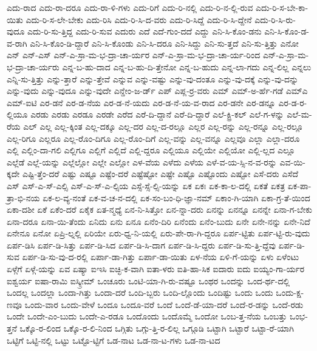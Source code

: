 {ಎದು-ರಾದ
ಎದು-ರಾ-ದರೂ
ಎದು-ರಾ-ಳಿ-ಗಳು
ಎದು-ರಿಗೆ
ಎದು-ರಿ-ನಲ್ಲಿ
ಎದು-ರಿ-ನ-ಲ್ಲಿ-ರುವ
ಎದು-ರಿ-ಸ-ಬೇ-ಕಾ-ಯಿತು
ಎದು-ರಿ-ಸ-ಲೇ-ಬೇಕು
ಎದು-ರಿಸಿ
ಎದು-ರಿ-ಸಿ-ದ-ವರು
ಎದು-ರಿ-ಸಿದ್ದೆ
ಎದು-ರಿ-ಸಿ-ದ್ದೇನೆ
ಎದು-ರಿ-ಸಿ-ರು-ವುದೂ
ಎದು-ರಿ-ಸು-ತ್ತಿದ್ದ
ಎದು-ರಿ-ಸುವ
ಎದುರು
ಎದೆ
ಎದೆ-ಗುಂ-ದದೆ
ಎದ್ದು
ಎನಿ-ಸಿ-ಕೊಂ-ಡನು
ಎನಿ-ಸಿ-ಕೊಂ-ಡ-ವ-ರಾಗಿ
ಎನಿ-ಸಿ-ಕೊಂ-ಡಿ-ದ್ದಾರೆ
ಎನಿ-ಸಿ-ಕೊಂಡು
ಎನಿ-ಸಿ-ದರೂ
ಎನಿ-ಸಿದ್ದು
ಎನಿ-ಸು-ತ್ತದೆ
ಎನಿ-ಸು-ತ್ತಿತ್ತು
ಎನೋ
ಎನ್
ಎನ್-ಎಸ್
ಎನ್-ಎ-ಸ್ರಾ-ಮ-ಭ-ದ್ರಾ-ಚಾ-ರ್ಯರ
ಎನ್-ಎ-ಸ್ರಾ-ಮ-ಭ-ದ್ರಾ-ಚಾ-ರ್ಯ-ರಿಂದ
ಎನ್-ಎ-ಸ್ರಾ-ಮ-ಭ-ದ್ರಾ-ಚಾ-ರ್ಯರು
ಎನ್ನ-ಬ-ಹು-ದಾದ
ಎನ್ನ-ಬ-ಹು-ದಿ-ತ್ತೇನೋ
ಎನ್ನ-ಬ-ಹುದು
ಎನ್ನ-ಲಾ-ಗದು
ಎನ್ನ-ಲಿಲ್ಲ
ಎನ್ನಲು
ಎನ್ನಿ-ಸು-ತ್ತಿತ್ತು
ಎನ್ನು-ತ್ತಾರೆ
ಎನ್ನು-ತ್ತೇವೆ
ಎನ್ನುವ
ಎನ್ನು-ವಷ್ಟು
ಎನ್ನು-ವು-ದಂತೂ
ಎನ್ನು-ವು-ದಕ್ಕೆ
ಎನ್ನು-ವು-ದನ್ನು
ಎನ್ನು-ವುದು
ಎನ್ನು-ವುದೂ
ಎನ್ನು-ವುದೇ
ಎನ್ಡೇಂ-ಜ-ರ್ಡ್
ಎಪ್
ಎಪ್ಲ-ರ್ರ-ವರು
ಎಮ್
ಎಮ್-ಅ-ರ್ಹೆ-ಗಡೆ
ಎಮ್ಎ
ಎಮ್-ಐಟಿ
ಎರ-ಡನೆ
ಎರ-ಡ-ನೆಯ
ಎರ-ಡ-ನೆ-ಯದು
ಎರ-ಡ-ನೆ-ಯ-ವ-ರಾದ
ಎರ-ಡನೇ
ಎರ-ಡನ್ನೂ
ಎರ-ಡ-ರ-ಲ್ಲಿಯೂ
ಎರಡು
ಎರಡು
ಎರಡೂ
ಎರಡೇ
ಎರೆದ
ಎರೆ-ದಿ-ದ್ದಾನೆ
ಎರೆ-ದಿ-ದ್ದಾರೆ
ಎಲೆ-ಕ್ಟ್ರಿ-ಕಲ್
ಎಲೆ-ಗ-ಳನ್ನು
ಎಲೆ-ಮ-ರೆಯ
ಎಲ್
ಎಲ್ಲ
ಎಲ್ಲ-ಕ್ಕಿಂತ
ಎಲ್ಲ-ದಕ್ಕೂ
ಎಲ್ಲ-ದರ
ಎಲ್ಲ-ದ-ರಲ್ಲೂ
ಎಲ್ಲರ
ಎಲ್ಲ-ರನ್ನು
ಎಲ್ಲ-ರನ್ನೂ
ಎಲ್ಲ-ರಲ್ಲೂ
ಎಲ್ಲ-ರಿಗೂ
ಎಲ್ಲರೂ
ಎಲ್ಲ-ರೊಂ-ದಿಗೂ
ಎಲ್ಲ-ರೊಂ-ದಿಗೆ
ಎಲ್ಲ-ವನ್ನು
ಎಲ್ಲ-ವನ್ನೂ
ಎಲ್ಲವೂ
ಎಲ್ಲಾ
ಎಲ್ಲಾ-ದರೂ
ಎಲ್ಲಿ
ಎಲ್ಲಿಂ-ದಾ-ಗಲಿ
ಎಲ್ಲಿಗೂ
ಎಲ್ಲಿಗೆ
ಎಲ್ಲಿದೆ
ಎಲ್ಲಿ-ದ್ದರೂ
ಎಲ್ಲಿಯೂ
ಎಲ್ಲಿಯೇ
ಎಲ್ಲಿಯೋ
ಎಲ್ಲಿ-ಲ್ಲದ
ಎಲ್ಲೂ
ಎಲ್ಲೆಡೆ
ಎಲ್ಲೆ-ಯನ್ನು
ಎಲ್ಲೆಲ್ಲೋ
ಎಲ್ಲೇ
ಎಲ್ಲೋ
ಎಳ-ವೆಯ
ಎಳೆದು
ಎಳೆಯ
ಎಳೆ-ವ-ಯ-ಸ್ಸಿ-ನ-ವ-ರನ್ನು
ಎವ-ಯಿ-ಕ್ಕದೇ
ಎಷ್ಟಿ-ತ್ತೆಂ-ದರೆ
ಎಷ್ಟು
ಎಷ್ಟೂ
ಎಷ್ಟೆಂ-ದರೆ
ಎಷ್ಟೆಷ್ಟೋ
ಎಷ್ಟೇ
ಎಷ್ಟೊ
ಎಷ್ಟೊಂದು
ಎಷ್ಟೋ
ಎಸೆ-ದರು
ಎಸೆದೆ
ಎಸ್
ಎಸ್-ಎ-ಸ್-ಎಲ್ಸಿ
ಎಸ್-ಎ-ಸ್-ಎ-ಲ್ಸಿಯ
ಎಸ್ಸೆ-ಸ್ಸೆ-ಲ್ಸಿ-ಯನ್ನು
ಏಕ
ಏಕಃ
ಏಕ-ಕಾ-ಲ-ದಲ್ಲಿ
ಏಕತೆ
ಏಕತ್ರ
ಏಕ-ಪಾ-ತ್ರಾ-ಭಿ-ನಯ
ಏಕ-ಲ-ವ್ಯ-ನಂತೆ
ಏಕ-ವ-ಚ-ನ-ದಲ್ಲಿ
ಏಕ-ಸಂ-ಬಂ-ಧಿ-ಜ್ಞಾ-ನಮ್
ಏಕಾಂ-ಗಿ-ಯಾಗಿ
ಏಕಾ-ಗ್ರ-ತೆ-ಯಿಂದ
ಏಕಾ-ದಶೀ
ಏಕೆ
ಏಕೆಂ-ದರೆ
ಏಕೈಕ
ಏತ-ನ್ಮಧ್ಯೆ
ಏನ-ನಿ-ಸಿತ್ತೋ
ಏನ-ನ್ನಾ-ದರು
ಏನನ್ನು
ಏನನ್ನೂ
ಏನನ್ನೇ
ಏನಾ-ಗ-ಬೇಕು
ಏನಾ-ದರೂ
ಏನಾ-ಯಿ-ತೆಂದು
ಏನಿದು
ಏನು
ಏನೂ
ಏನೆಂ-ದಿರಿ
ಏನೆಂದು
ಏನೆಂ-ಬುದು
ಏನೇ
ಏನೇ-ನನ್ನು
ಏನೇ-ನಿದೆ
ಏನೇನೂ
ಏನೋ
ಏಪ್ರಿ-ಲ್ನಲ್ಲಿ
ಏರಿಯೇ
ಏರು-ಧ್ವ-ನಿ-ಯಲ್ಲಿ
ಏರು-ಪೇ-ರಾ-ಗಿ-ದ್ದರೂ
ಏರ್ಪ-ಟ್ಟಿತು
ಏರ್ಪ-ಟ್ಟಿ-ರು-ವುದು
ಏರ್ಪ-ಡಿಸಿ
ಏರ್ಪ-ಡಿ-ಸಿತ್ತು
ಏರ್ಪ-ಡಿ-ಸಿದ
ಏರ್ಪ-ಡಿ-ಸಿ-ದಾಗ
ಏರ್ಪ-ಡಿ-ಸಿ-ದ್ದರು
ಏರ್ಪ-ಡಿ-ಸು-ತ್ತಿ-ದ್ದೆವು
ಏರ್ಪ-ಡಿ-ಸುವ
ಏರ್ಪ-ಡಿ-ಸು-ವು-ದ-ರಲ್ಲಿ
ಏರ್ಪಾ-ಡಾ-ಗಿತ್ತು
ಏರ್ಪಾ-ಡಾ-ಯಿತು
ಏಳ-ನೆಯ
ಏಳಿ-ಗೆ-ಯನ್ನು
ಏಳು
ಏಳೆಂಟು
ಏಳ್ಗೆಗೆ
ಏಳ್ಗೆ-ಯನ್ನು
ಏವ
ಏಷ್ಯಾ
ಐಇಸಿ
ಐಚ್ಛಿ-ಕ-ವಾಗಿ
ಐತಾ-ಳರು
ಐತಿ-ಹಾ-ಸಿಕ
ಐದಾರು
ಐದು
ಐಯ್ಯಂ-ಗಾ-ರ್ಯರ
ಐಶ್ವರ್ಯ
ಐಷಾ-ರಾಮಿ
ಐಸ್ಕ್ರೀಮ್
ಒಂಚೂರು
ಒಂಟಿ-ಯಾ-ಗಿ-ರು-ವಷ್ಟೂ
ಒಂಥರ
ಒಂದನ್ನು
ಒಂದ-ರ್ಥ-ದಲ್ಲಿ
ಒಂದಲ್ಲ
ಒಂದಲ್ಲಾ
ಒಂದಾ-ಗಿತ್ತು
ಒಂದಾ-ದರೆ
ಒಂದಿ-ಬ್ಬರು
ಒಂದಿ-ಲ್ಲೊಂದು
ಒಂದಿಷ್ಟು
ಒಂದು
ಒಂದು
ಒಂದು-ಕ್ಷ-ಣವೂ
ಒಂದು-ವಾರ
ಒಂದು-ವೇಳೆ
ಒಂದೂ
ಒಂದೂ-ವರೆ
ಒಂದೆ
ಒಂದೆ-ಡೆ-ಯಾ-ದರೆ
ಒಂದೆ-ರ-ಡನ್ನು
ಒಂದೆ-ರಡು
ಒಂದೇ
ಒಂದೇ-ಎಂ-ಬುದು
ಒಂದೇ-ಎ-ರಡೂ
ಒಂದೊಂದು
ಒಂದೊಮ್ಮೆ
ಒಂದೋ
ಒಂಬ-ತ್ತ-ನೆಯ
ಒಂಬತ್ತು
ಒಂಭ-ತ್ತನೆ
ಒಕ್ಕೊ-ರ-ಲಿಂದ
ಒಕ್ಕೊ-ರ-ಲಿ-ನಿಂದ
ಒಗ್ಗಿತು
ಒಗ್ಗು-ತ್ತಿ-ರ-ಲಿಲ್ಲ
ಒಗ್ಗೂಡಿ
ಒಟ್ಟಾಗಿ
ಒಟ್ಟಾರೆ
ಒಟ್ಟಾ-ರೆ-ಯಾಗಿ
ಒಟ್ಟಿಗೆ
ಒಟ್ಟಿ-ನಲ್ಲಿ
ಒಟ್ಟು
ಒಟ್ಟೊ-ಟ್ಟಿಗೆ
ಒಡ-ನಾಟ
ಒಡ-ನಾ-ಟ-ಗಳು
ಒಡ-ನಾ-ಟದ
}
